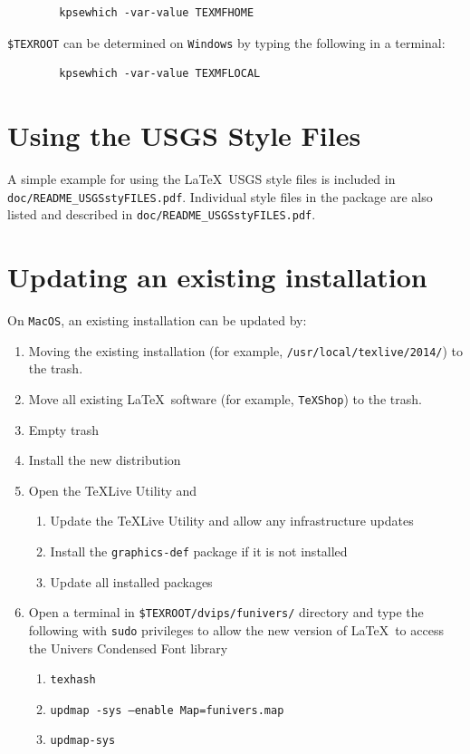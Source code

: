 \documentclass[11pt]{article}
\begin{document}
\begin{enumerate}
	\begin{verbatim}
		kpsewhich -var-value TEXMFHOME
	\end{verbatim}
	
	\texttt{\$TEXROOT} can be determined on \texttt{Windows} by typing the following in a terminal:

	\begin{verbatim}
		kpsewhich -var-value TEXMFLOCAL
	\end{verbatim}


\end{enumerate}

\section*{\textsf{Using the USGS Style Files}}
A simple example for using the \LaTeX~USGS style files is included in \texttt{doc/README\_USGSstyFILES.pdf}. Individual style files in the package are also listed and described in \texttt{doc/README\_USGSstyFILES.pdf}.

\section*{\textsf{Updating an existing installation}}
On \texttt{MacOS}, an existing installation can be updated by:

\begin{enumerate}
	\item Moving the existing installation (for example, \texttt{/usr/local/texlive/2014/}) to the trash.
	\item Move all existing \LaTeX\ software (for example, \texttt{TeXShop}) to the trash.
	\item Empty trash
	\item Install the new distribution
	\item Open the \TeX Live Utility and
	\begin{enumerate}
		\item Update the \TeX Live Utility and allow any infrastructure updates
		\item Install the \texttt{graphics-def} package if it is not installed
		\item Update all installed packages
	\end{enumerate}
	\item Open a terminal in \texttt{\$TEXROOT/dvips/funivers/} directory and type the following with \texttt{sudo} privileges to allow the new version of \LaTeX\ to access the Univers Condensed Font library
	\begin{enumerate}
		\item \texttt{texhash}
		\item \texttt{updmap -sys --enable Map=funivers.map}
		\item \texttt{updmap-sys}
	\end{enumerate}
\end{enumerate}
\end{document}
